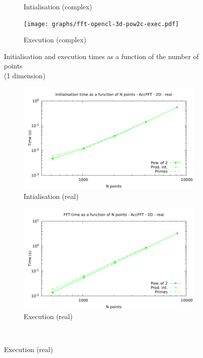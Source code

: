 \documentclass[12pt, a4paper]{article}
\begin{document}
\begin{figure}[H]
\begin{subfigure}{.5\textwidth}
\caption{Intialisation (complex)}
\label{FFTCL1DCI}
\end{subfigure}%
\begin{subfigure}{.5\textwidth}
\centering
\texttt{[image: graphs/fft-opencl-3d-pow2c-exec.pdf]}
\caption{Execution (complex)}
\label{FFTCL1DCE}
\end{subfigure}
\caption{Initialisation and execution times as a function of the number of points\\(1 dimension)}
\label{FFTCL1D}
\end{figure}


\begin{figure}[H]
\captionsetup{width=0.8\linewidth}
\centering
\begin{subfigure}{.5\textwidth}
\centering
\includegraphics[width=.9\linewidth]{graphs/fft-openacc-2d-pow2-r-init.pdf}
\caption{Intialisation (real)}
\label{FFTACC1DRI}
\end{subfigure}%
\begin{subfigure}{.5\textwidth}
\centering
\includegraphics[width=.9\linewidth]{graphs/fft-openacc-2d-pow2-r-exec.pdf}
\caption{Execution (real)}
\label{FFTACC1DRE}
\end{subfigure}\\

\end{figure}
\end{document}
